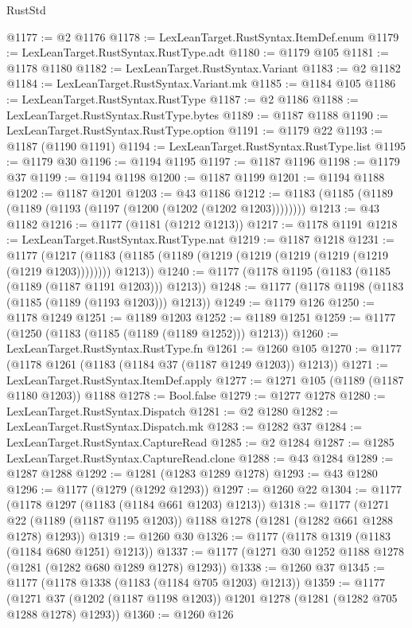 \begin{lexlean}{RustStd}
\begin{coremodule}
{\begin{coremodule}
{{{{{{{{{{{{{{{{{{{{{{{{{{{{{{{@1177 := @2 @1176
@1178 := LexLeanTarget.RustSyntax.ItemDef.enum
@1179 := LexLeanTarget.RustSyntax.RustType.adt
@1180 := @1179 @105
@1181 := @1178 @1180
@1182 := LexLeanTarget.RustSyntax.Variant
@1183 := @2 @1182
@1184 := LexLeanTarget.RustSyntax.Variant.mk
@1185 := @1184 @105
@1186 := LexLeanTarget.RustSyntax.RustType
@1187 := @2 @1186
@1188 := LexLeanTarget.RustSyntax.RustType.bytes
@1189 := @1187 @1188
@1190 := LexLeanTarget.RustSyntax.RustType.option
@1191 := @1179 @22
@1193 := @1187 (@1190 @1191)
@1194 := LexLeanTarget.RustSyntax.RustType.list
@1195 := @1179 @30
@1196 := @1194 @1195
@1197 := @1187 @1196
@1198 := @1179 @37
@1199 := @1194 @1198
@1200 := @1187 @1199
@1201 := @1194 @1188
@1202 := @1187 @1201
@1203 := @43 @1186
@1212 := @1183 (@1185 (@1189 (@1189 (@1193 (@1197 (@1200 (@1202 (@1202 @1203))))))))
@1213 := @43 @1182
@1216 := @1177 (@1181 (@1212 @1213))
@1217 := @1178 @1191
@1218 := LexLeanTarget.RustSyntax.RustType.nat
@1219 := @1187 @1218
@1231 := @1177
    (@1217 (@1183 (@1185 (@1189 (@1219 (@1219 (@1219 (@1219 (@1219 (@1219 @1203)))))))) @1213))
@1240 := @1177 (@1178 @1195 (@1183 (@1185 (@1189 (@1187 @1191 @1203))) @1213))
@1248 := @1177 (@1178 @1198 (@1183 (@1185 (@1189 (@1193 @1203))) @1213))
@1249 := @1179 @126
@1250 := @1178 @1249
@1251 := @1189 @1203
@1252 := @1189 @1251
@1259 := @1177 (@1250 (@1183 (@1185 (@1189 (@1189 @1252))) @1213))
@1260 := LexLeanTarget.RustSyntax.RustType.fn
@1261 := @1260 @105
@1270 := @1177 (@1178 @1261 (@1183 (@1184 @37 (@1187 @1249 @1203)) @1213))
@1271 := LexLeanTarget.RustSyntax.ItemDef.apply
@1277 := @1271 @105 (@1189 (@1187 @1180 @1203)) @1188
@1278 := Bool.false
@1279 := @1277 @1278
@1280 := LexLeanTarget.RustSyntax.Dispatch
@1281 := @2 @1280
@1282 := LexLeanTarget.RustSyntax.Dispatch.mk
@1283 := @1282 @37
@1284 := LexLeanTarget.RustSyntax.CaptureRead
@1285 := @2 @1284
@1287 := @1285 LexLeanTarget.RustSyntax.CaptureRead.clone
@1288 := @43 @1284
@1289 := @1287 @1288
@1292 := @1281 (@1283 @1289 @1278)
@1293 := @43 @1280
@1296 := @1177 (@1279 (@1292 @1293))
@1297 := @1260 @22
@1304 := @1177 (@1178 @1297 (@1183 (@1184 @661 @1203) @1213))
@1318 := @1177
    (@1271 @22 (@1189 (@1187 @1195 @1203)) @1188 @1278 (@1281 (@1282 @661 @1288 @1278) @1293))
@1319 := @1260 @30
@1326 := @1177 (@1178 @1319 (@1183 (@1184 @680 @1251) @1213))
@1337 := @1177 (@1271 @30 @1252 @1188 @1278 (@1281 (@1282 @680 @1289 @1278) @1293))
@1338 := @1260 @37
@1345 := @1177 (@1178 @1338 (@1183 (@1184 @705 @1203) @1213))
@1359 := @1177
    (@1271 @37 (@1202 (@1187 @1198 @1203)) @1201 @1278 (@1281 (@1282 @705 @1288 @1278) @1293))
@1360 := @1260 @126
}}}}}}}}}}}}}}}}}}}}}}}}}}}}}}}
\end{coremodule}}
\end{coremodule}
\end{lexlean}
